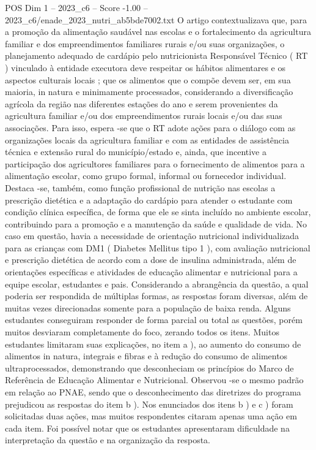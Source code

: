 \begin{textsample}{POS Dim 1 – 2023\_c6 – Score -1.00 – 2023\_c6/enade\_2023\_nutri\_ab5bde7002.txt}
O artigo contextualizava que, para a promoção da alimentação saudável nas escolas e o fortalecimento da agricultura familiar e dos empreendimentos familiares rurais e/ou suas organizações, o planejamento adequado de cardápio pelo nutricionista Responsável Técnico ( RT ) vinculado à entidade executora deve respeitar os hábitos alimentares e os aspectos culturais locais ; que os alimentos que o compõe devem ser, em sua maioria, in natura e minimamente processados, considerando a diversificação agrícola da região nas diferentes estações do ano e serem provenientes da agricultura familiar e/ou dos empreendimentos rurais locais e/ou das suas associações.
Para isso, espera -se que o RT adote ações para o diálogo com as organizações locais da agricultura familiar e com as entidades de assistência técnica e extensão rural do município/estado e, ainda, que incentive a participação dos agricultores familiares para o fornecimento de alimentos para a alimentação escolar, como grupo formal, informal ou fornecedor individual.
Destaca -se, também, como função profissional de nutrição nas escolas a prescrição dietética e a adaptação do cardápio para atender o estudante com condição clínica específica, de forma que ele se sinta incluído no ambiente escolar, contribuindo para a promoção e a manutenção da saúde e qualidade de vida.
No caso em questão, havia a necessidade de orientação nutricional individualizada para as crianças com DM1 ( Diabetes Mellitus tipo 1 ), com avaliação nutricional e prescrição dietética de acordo com a dose de insulina administrada, além de orientações específicas e atividades de educação alimentar e nutricional para a equipe escolar, estudantes e pais.
Considerando a abrangência da questão, a qual poderia ser respondida de múltiplas formas, as respostas foram diversas, além de muitas vezes direcionadas somente para a população de baixa renda.
Alguns estudantes conseguiram responder de forma parcial ou total as questões, porém muitos desviaram completamente do foco, zerando todos os itens.
Muitos estudantes limitaram suas explicações, no item a ), ao aumento do consumo de alimentos in natura, integrais e fibras e à redução do consumo de alimentos ultraprocessados, demonstrando que desconheciam os princípios do Marco de Referência de Educação Alimentar e Nutricional.
Observou -se o mesmo padrão em relação ao PNAE, sendo que o desconhecimento das diretrizes do programa prejudicou as respostas do item b ).
Nos enunciados dos itens b ) e c ) foram solicitadas duas ações, mas muitos respondentes citaram apenas uma ação em cada item.
Foi possível notar que os estudantes apresentaram dificuldade na interpretação da questão e na organização da resposta.

\end{textsample}
